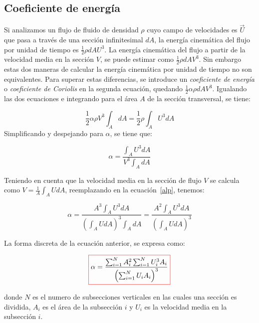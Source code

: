 \documentclass[11pt, oneside]{article}
\begin{document}
\subsection{Coeficiente de energ\'ia}
Si analizamos un flujo de fluido de densidad $\rho$ cuyo campo de velocidades es $\vec{U}$ que pasa a través de una sección infinitesimal $dA$, la energ\'ia cinem\'atica del flujo por unidad de tiempo es $\frac{1}{2}\rho dA U^3$. La energ\'ia cinem\'atica del flujo a partir de la velocidad media en la sección $V$, se puede estimar como  $\frac{1}{2}\rho dA V^3$. Sin embargo estas dos maneras de calcular la energ\'ia cinem\'atica por unidad de tiempo no son equivalentes. Para superar estas diferencias, se introduce un \emph{coeficiente de energía} o \emph{coeficiente de Coriolis} en la segunda ecuaci\'on, quedando $\frac{1}{2}\alpha \rho dA V^3$. Igualando las dos ecuaciones e integrando para el área $A$ de la sección transversal, se tiene:

$$
\frac{1}{2}\alpha\rho V^3 \int_A dA  = \frac{1}{2}\rho \int_A U^3 dA 
$$
Simplificando y despejando para $\alpha$, se tiene que:

\begin{equation}
\alpha = \frac{\int_A U^3 dA}{V^3 \int_A dA}
\label{alp}
\end{equation}

Teniendo en cuenta que la velocidad media en la secci\'on de flujo $V$ se calcula como $V=\frac{1}{A}\int_A U dA$, reemplazando en la ecuaci\'on~\ref{alp}, tenemos:

\begin{equation}
\alpha = \frac{A^3 \int_A U^3 dA}{\left(\int_A U dA \right)^3 \int_A dA}= \frac{A^2 \int_A U^3 dA}{\left(\int_A U dA \right)^3 }
\label{alp2}
\end{equation}

La forma discreta de la ecuaci\'on anterior, se expresa como:

\begin{equation}
\color{red}\boxed{\color{black} \alpha = \frac{\sum_{i=1}^{N}A_i^2 \sum_{i=1}^{N} U_i^3 A_i} {\left(\sum_{i=1}^{N} U_i A_i \right)^3 }}
\label{alp3}
\end{equation}

donde $N$ es el numero de subsecciones verticales en las cuales una secci\'on es dividida, $A_i$ es el área de la subsecci\'on $i$ y $U_i$ es la velocidad media en la subsecci\'on $i$.
\end{document}
